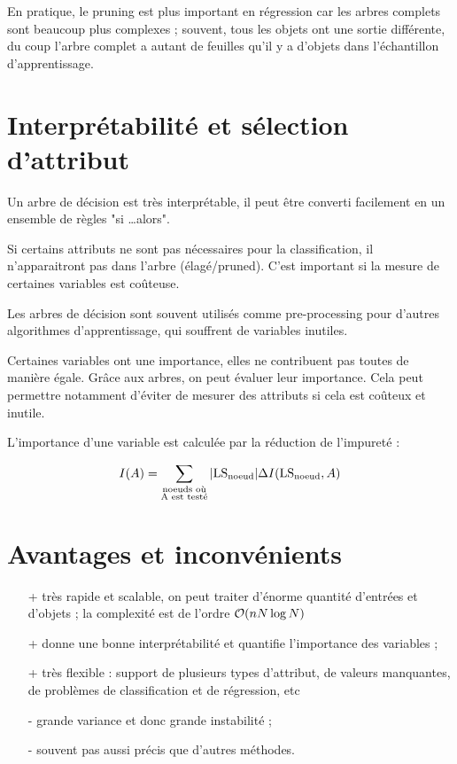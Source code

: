 	En pratique, le pruning est plus important en régression car les arbres complets sont beaucoup plus complexes ; souvent, tous les objets ont une sortie différente, du coup l'arbre complet a autant de feuilles qu'il y a d'objets dans l'échantillon d'apprentissage.


\section{Interprétabilité et sélection d'attribut}
	
	Un arbre de décision est très interprétable, il peut être converti facilement en un ensemble de règles "si \dots alors".
	
	Si certains attributs ne sont pas nécessaires pour la classification, il n'apparaitront pas dans l'arbre (élagé/pruned). C'est important si la mesure de certaines variables est coûteuse.
	
	Les arbres de décision sont souvent utilisés comme pre-processing pour d'autres algorithmes d'apprentissage, qui souffrent de variables inutiles.
	
	Certaines variables ont une importance, elles ne contribuent pas toutes de manière égale. Grâce aux arbres, on peut évaluer leur importance. Cela peut permettre notamment d'éviter de mesurer des attributs si cela est coûteux et inutile.
	
	L'importance d'une variable est calculée par la réduction de l'impureté :
	
	$$I(A) = \sum_{\substack{\text{noeuds où} \\ \text{A est testé}}} \vert \text{LS}_{\text{noeud}} \vert \Delta I(\text{LS}_{\text{noeud}}, A)$$
	
	
	\section{Avantages et inconvénients}
	
	\begin{itemize}
		\item[+] très rapide et scalable, on peut traiter d'énorme quantité d'entrées et d'objets ; la complexité est de l'ordre $\mathcal{O} (nN\log N)$
		\item[+] donne une bonne interprétabilité et quantifie l'importance des variables ;
		\item[+] très flexible : support de plusieurs types d'attribut, de valeurs manquantes, de problèmes de classification et de régression, etc
		\item[-] grande variance et donc grande instabilité ;
		\item[-] souvent pas aussi précis que d'autres méthodes.
	\end{itemize}
	

